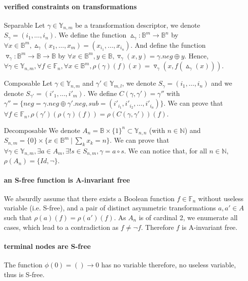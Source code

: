\documentclass[a4paper,10pt]{article}
\newcommand{\N}{\mathbb{N}}%
\newcommand{\B}{\mathbb{B}}
\newcommand{\F}{\mathbb{F}}
\newcommand{\Y}{\mathbb{Y}}
\begin{document}
\paragraph{verified constraints on transformations}
\begin{compactitem}
\item[Separable]
Let $\gamma\in\Y_{n, m}$ be a transformation descriptor, we denote $S_{\gamma} = (i_1, \dots, i_n)$.
We define the function $\vartriangle_\gamma: \B^m \longrightarrow \B^n$ by $\forall x\in\B^m, \vartriangle_\gamma(x_1, \dots, x_m) = (x_{i_1}, \dots, x_{i_n})$.
And define the function $\triangledown_\gamma: \B^m \longrightarrow \B \longrightarrow \B$ by $\forall x\in\B^m, y\in\B, \triangledown_\gamma(x, y) = \gamma.neg \oplus y$.
Hence, $\forall \gamma\in\Y_{n, m},\forall f\in\F_n, \forall x\in\B^m, \rho(\gamma)(f)(x) = \triangledown_\gamma(x, f(\vartriangle_\gamma(x)))$.
\item[Composable]
Let $\gamma\in\Y_{n, m}$ and $\gamma'\in\Y_{m, l}$, we denote $S_{\gamma} = (i_1, \dots, i_n)$ and we denote $S_{\gamma'} = (i'_1, \dots, i'_m)$.
We define $C(\gamma, \gamma') = \gamma''$ with $\gamma'' = \{neg = \gamma.neg \oplus \gamma'.neg, sub = (i'_{i_1}, i'_{i_2}, \dots, i'_{i_n})\}$.
We can prove that $\forall f\in\F_n, \rho(\gamma')(\rho(\gamma)(f)) = \rho(C(\gamma, \gamma'))(f)$.
\item[Decomposable]
We denote $A_n = \B\times\{1\}^n \subset\Y_{n, n}$ (with $n\in\N$) and $S_{n, m} = \{0\}\times\{x\in\B^m~|~\sum_k x_k = n\}$.
We can prove that $\forall \gamma \in \Y_{n, m}, \exists a \in A_m, \exists! s \in S_{n, m}, \gamma = a \circ s$.
We can notice that, for all $n\in\N$, $\rho(A_n) = \{Id, \lnot\}$.
\end{compactitem}


\paragraph{an S-free function is A-invariant free\\}
We absurdly assume that there exists a Boolean function $f\in\F_n$ without useless variable (i.e. S-free), and a pair of distinct asymmetric transformations $a, a'\in A$ such that $\rho(a)(f) = \rho(a')(f)$.
As $A_n$ is of cardinal 2, we enumerate all cases, which lead to a contradiction as $f \neq \lnot f$.
Therefore $f$ is A-invariant free.

\paragraph{terminal nodes are S-free\\}
The function $\phi(0) = () \longrightarrow 0$ has no variable therefore, no useless variable, thus is S-free.
\end{document}
